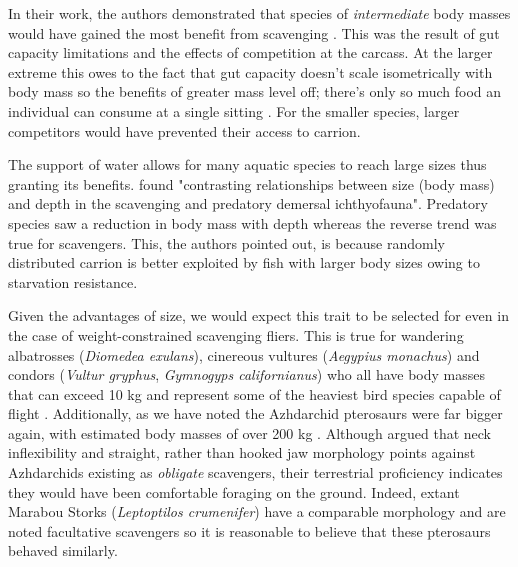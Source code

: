 \documentclass[a4paper,12pt]{article}
\begin{document}
In their work, the authors demonstrated that species of \textit{intermediate} body masses would have gained the most benefit from scavenging \citep{kane2016body}.
This was the result of gut capacity limitations and the effects of competition at the carcass.
At the larger extreme this owes to the fact that gut capacity doesn't scale isometrically with body mass so the benefits of greater mass level off; there's only so much food an individual can consume at a single sitting \citep{calder1996size}.
For the smaller species, larger competitors would have prevented their access to carrion.


The support of water allows for many aquatic species to reach large sizes thus granting its benefits. 
\cite{collins2005trends} found "contrasting relationships between size (body mass) and depth in the scavenging and predatory demersal ichthyofauna". 
Predatory species saw a reduction in body mass with depth whereas the reverse trend was true for scavengers. 
This, the authors pointed out, is because randomly distributed carrion is better exploited by fish with larger body sizes owing to starvation resistance.  

Given the advantages of size, we would expect this trait to be selected for even in the case of weight-constrained scavenging fliers.
This is true for wandering albatrosses (\textit{Diomedea exulans}), cinereous vultures (\textit{Aegypius monachus}) and condors (\textit{Vultur gryphus}, \textit{Gymnogyps californianus}) who all have body masses that can exceed 10 kg and represent some of the heaviest bird species capable of flight \citep{weimerskirch1992reproductive,ferguson2001raptors,donazar2002effects}.
Additionally, as we have noted the Azhdarchid pterosaurs were far bigger again, with estimated body masses of over 200 kg \citep{witton2010size}.
Although \cite{witton2008reappraisal} argued that neck inflexibility and straight, rather than hooked jaw morphology points against Azhdarchids existing as \textit{obligate} scavengers, their terrestrial proficiency indicates they would have been comfortable foraging on the ground.
Indeed, extant Marabou Storks (\textit{Leptoptilos crumenifer}) have a comparable morphology and are noted facultative scavengers \citep{monadjem2012survival} so it is reasonable to believe that these pterosaurs behaved similarly.
\end{document}
